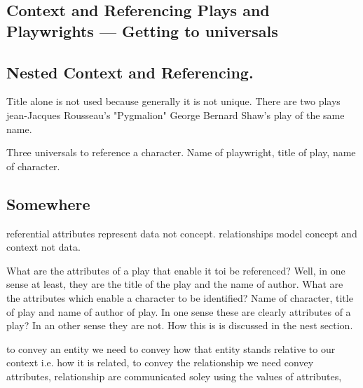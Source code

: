 \subsection{Context and Referencing Plays and Playwrights --- Getting to universals}
\newpage
\subsection{Nested Context and Referencing.}
\mynote Title alone is not used because generally it is not unique.
There are two plays jean-Jacques Rousseau's "Pygmalion"
George Bernard Shaw's play of the same name.

Three universals to reference a character. Name of playwright, title of play, name of character.

\subsection{Somewhere}
\mynote
referential attributes represent data not concept.
\mynote
relationships model concept and context not data.

\mynote What are the attributes of a play that enable it toi be referenced? Well, in one sense at least, they are the title of the play and the name of author. What are the attributes which enable a character to be identified? Name of character, title of play and name of author of play. In one sense these are clearly attributes of a play? In an other sense they are not. How this is is discussed in the nest section.  

\mynote to convey an entity we need to convey how that entity stands relative to our context i.e. how it is related,
to convey the relationship we need convey attributes,
 relationship are communicated soley using the values of attributes,
 
